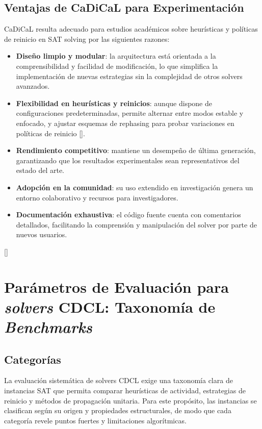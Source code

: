 \subsection{Ventajas de CaDiCaL para Experimentación}
CaDiCaL resulta adecuado para estudios académicos sobre heurísticas y políticas de reinicio en SAT solving por las siguientes razones:
\begin{itemize}
  \item \textbf{Diseño limpio y modular}: la arquitectura está orientada a la comprensibilidad y facilidad de modificación, lo que simplifica la implementación de nuevas estrategias sin la complejidad de otros solvers avanzados.
  \item \textbf{Flexibilidad en heurísticas y reinicios}: aunque dispone de configuraciones predeterminadas, permite alternar entre modos estable y enfocado, y ajustar esquemas de rephasing para probar variaciones en políticas de reinicio [\cite{cai2022better_heuristics}]. %
  \item \textbf{Rendimiento competitivo}: mantiene un desempeño de última generación, garantizando que los resultados experimentales sean representativos del estado del arte.
  \item \textbf{Adopción en la comunidad}: su uso extendido en investigación genera un entorno colaborativo y recursos para investigadores.
  \item \textbf{Documentación exhaustiva}: el código fuente cuenta con comentarios detallados, facilitando la comprensión y manipulación del solver por parte de nuevos usuarios.
\end{itemize} [\cite{cadical2024}]



\section{Parámetros de Evaluación para \textit{solvers} CDCL: Taxonomía de \textit{Benchmarks}}
\label{sec:tipos-problemas}
\subsection{Categor\'ias}
\label{subsec:problem-categor}
La evaluación sistemática de solvers CDCL exige una taxonomía clara de instancias SAT que permita comparar heurísticas de actividad, estrategias de reinicio y métodos de propagación unitaria. Para este propósito, las instancias se clasifican según su origen y propiedades estructurales, de modo que cada categoría revele puntos fuertes y limitaciones algorítmicas.

